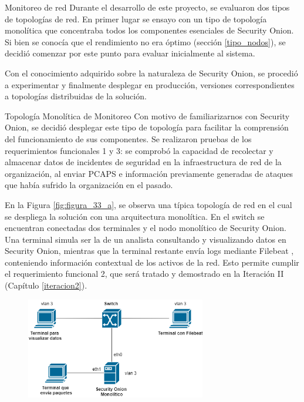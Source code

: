     \begin{section}{Monitoreo de red}
        Durante el desarrollo de este proyecto, se evaluaron dos tipos de topologías de red. En primer lugar se ensayo con un tipo de topología monolítica que concentraba todos los componentes esenciales de Security Onion. Si bien se conocía que el rendimiento no era óptimo (sección \ref{tipo_nodos}), se decidió comenzar por este punto para evaluar inicialmente al sistema. \par      
        Con el conocimiento adquirido sobre la naturaleza de Security Onion, se procedió a experimentar y finalmente desplegar en producción, versiones correspondientes a topologías distribuidas de la solución. \par
    \end{section}
    
        \begin{subsection}{Topología Monolítica de Monitoreo}
            Con motivo de familiarizarnos con Security Onion, se decidió desplegar este tipo de topología para facilitar la comprensión del funcionamiento de sus componentes. Se realizaron pruebas de los requerimientos funcionales 1 y 3: se comprobó la capacidad de recolectar y almacenar datos de incidentes de seguridad en la infraestructura de red de la organización, al enviar PCAPS e información previamente generadas de ataques que había sufrido la organización en el pasado. \par
            En la Figura \ref{fig:figura_33_a}, se observa una típica topología de red en el cual se despliega la solución con una arquitectura monolítica. En el switch se encuentran conectadas dos terminales y el nodo monolítico de Security Onion. Una terminal simula ser la de un analista consultando y visualizando datos en Security Onion, mientras que la terminal restante envía logs mediante Filebeat \cite{filebeat}, conteniendo información contextual de los activos de la red. Esto permite cumplir el requerimiento funcional 2, que será tratado y demostrado en la Iteración II (Capítulo \ref{iteracion2}).
            \begin{figure}[H]
                \centering
                \includegraphics[width=0.7\textwidth]{./iteracion_1_imagenes/figura_33_a_topologia_de_prueba_1.png}

\end{figure}
\end{subsection}
